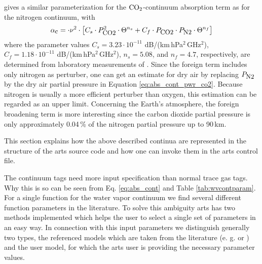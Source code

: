 {
\label{levelc:co2cont}
\citet{pwr:93} gives a similar parameterization for the $\mbox{CO}_2$-continuum 
absorption term as for the nitrogen continuum, with 
\begin{equation}
  \label{eq:abs_cont_pwr_co2}
    \alpha_{\mbox{\small c}} =   \cdot \nu^2 \cdot  
                \left[ C_s \cdot P_{\mbox{\rm \small CO2}}^2           \cdot \Theta^{n_s} +
                       C_f \cdot P_{\mbox{\rm \small CO2}}  \cdot P_{\mbox{\rm \small N2}} \cdot \Theta^{n_f} \right]
\end{equation}
where the parameter values $C_s = 3.23\cdot 10^{-11}$
dB/(km\,hPa$^2$\,GHz$^2$), $C_f = 1.18\cdot 10^{-11}$
dB/(km\,hPa$^2$\,GHz$^2$), $n_s=5.08$, and $n_f=4.7$, respectively, 
are determined from laboratory measurements of \cite{ho:66,dagg:75}. 
Since the foreign term
includes only nitrogen as perturber, one can get an estimate for dry
air by replacing $P_{\mbox{\rm \small N2}}$ by the dry air partial pressure in
Equation \ref{eq:abs_cont_pwr_co2}. Because nitrogen is usually a more
efficient perturber than oxygen, this estimation can be regarded as an
upper limit. Concerning the Earth's atmosphere, the foreign broadening
term is more interesting since the carbon dioxide partial pressure is
only approximately 0.04\,\% of the nitrogen partial pressure up to
90\,km.




\label{levelc:ArtsImplementationContinuum}

This section explains how the above described continua are represented 
in the structure of the arts source code and how one can invoke them in 
the arts control file.

The continuum tags need more input specification than normal trace gas
tags. Why this is so can be seen from Eq. \ref{eq:abs_cont} and 
Table \ref{tab:wvcontparam}. For a single function for the water vapor 
continuum we find several different function parameters in the literature. 
To solve this ambiguity arts has two methods implemented which helps 
the user to select a single set of parameters in an easy way. 
In connection with this input parameters we distinguish generally two 
types, the referenced models which are taken from the literature 
(e. g. \cite{liebeetal:93} or \cite{pwr:93}) and the user model, 
for which the arts user is providing the necessary parameter values.

}
